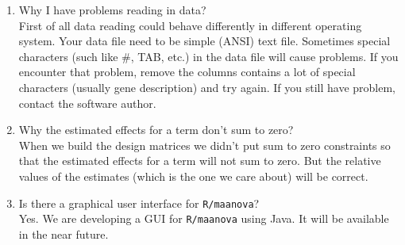 \begin{enumerate}
\item Why I have problems reading in data?\\
First of all data reading could behave differently
in different operating system. Your data file need
to be simple (ANSI) text file.
Sometimes special characters (such like \#, TAB, etc.)
in the data file will cause problems. If you encounter
that problem, remove the columns contains
a lot of special characters (usually gene description)
and try again. If you still have problem, contact
the software author.

\item Why the estimated effects for a term don't sum to zero?\\
When we build the design matrices we didn't put
sum to zero constraints so that the estimated effects
for a term will not sum to zero. But the relative
values of the estimates (which is the one we care about)
will be correct.

\item Is there a graphical user interface for {\tt R/maanova}?\\
Yes. We are developing a GUI for {\tt R/maanova} using Java.
It will be available in the near future.

\end{enumerate}
